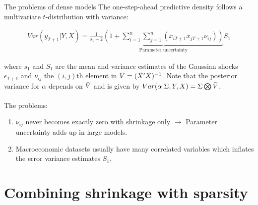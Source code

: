 \begin{frame}{The problems of dense models}
    The one-step-ahead predictive density follows a multivariate $t$-distribution with variance:
    
    \begin{align}
        Var(y_{T + 1}|Y,X) = \frac{1}{s_1 - 2} \underbrace{\left(1 + \sum_{i = 1}^{n} \sum_{j = 1}^{n} (x_{iT+1} x_{jT+1} \nu_{ij}) \right)}_{\text{Parameter uncertainty}} S_1
    \end{align}
    
    where $s_1$ and $S_1$ are the mean and variance estimates of the Gaussian shocks $\epsilon_{T + 1}$ and $\nu_{ij}$ the $(i,j)$th element in $\Bar{V} = (\Bar{X}'\Bar{X})^{-1}$. Note that the posterior variance for $\alpha$ depends on $\Bar{V}$ and is given by $Var(\alpha | \Sigma,Y,X) = \Sigma \bigotimes \Bar{V}$.\\~\\
    
    The problems:
    \begin{enumerate}
        \item $\nu_{ij}$ never becomes exactly zero with shrinkage only $\rightarrow$ Parameter uncertainty adds up in large models.
        \item Macroeconomic datasets usually have many correlated variables which inflates the error variance estimates $S_1$.
    \end{enumerate}
\end{frame}

\section{Combining shrinkage with sparsity}

